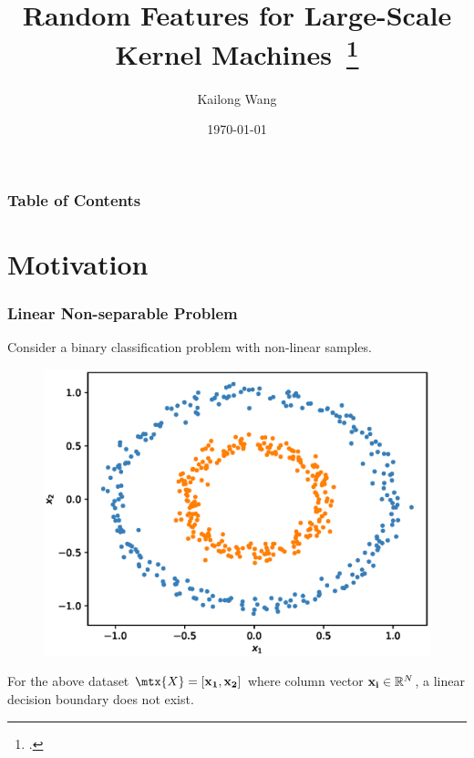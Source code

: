 \documentclass[10pt]{../formats/RU}
\title[Random Fourier Feature]{Random Features for Large-Scale Kernel Machines~\footcite{NIPS2007_013a006f}
}
\author[Kai] %
{Kailong Wang\inst{1}
}
\institute[Rutgers] %
{
  \inst{1}%
  Rutgers University
}
\date[\today] %
{
  \today}
\begin{document}
\frame{\titlepage}
\begin{frame}
\frametitle{Table of Contents}
\tableofcontents
\end{frame}



\section{Motivation}
\begin{frame}
  \frametitle{Linear Non-separable Problem}
  Consider a binary classification problem with non-linear samples.
  \begin{figure}
    \includegraphics[height=0.5\textheight]{./figs/2d_poly_circle.eps}%
  \end{figure}
  \eg For the above dataset $\mtx{X}=[\vec{x_1}, \vec{x_2}]$ where column vector $\mathbf{x_i}\in \mathbb{R}^N$, a linear decision boundary does not exist.
\end{frame}
\end{document}
